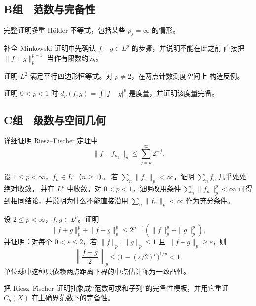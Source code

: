 \subsection*{B组　范数与完备性}
\begin{enumerate}[label=\textbf{\thechapter.\arabic*.},resume]
完整证明多重 Hölder 不等式，包括某些 \(p_j=\infty\) 的情形。

补全 Minkowski 证明中先确认 \(f+g\in L^p\) 的步骤，并说明不能在此之前
直接把 \(\|f+g\|_p^{p-1}\) 当作有限数约去。

证明 \(L^2\) 满足平行四边形恒等式。对 \(p\ne2\)，在两点计数测度空间上
构造反例。

证明 \(0<p<1\) 时 \(d_p(f,g)=\int|f-g|^p\) 是度量，并证明该度量完备。

\end{enumerate}
\subsection*{C组　级数与空间几何}
\begin{enumerate}[label=\textbf{\thechapter.\arabic*.},resume]
详细证明 Riesz--Fischer 定理中
\[
 \|f-f_{n_k}\|_p\le\sum_{j=k}^\infty2^{-j}.
\]

设 \(1\le p<\infty\)，\(f_n\in L^p\)（\(n\ge1\)）。
若 \(\sum_n\|f_n\|_p<\infty\)，证明 \(\sum_nf_n\) 几乎处处绝对收敛，
并在 \(L^p\) 中收敛。对 \(0<p<1\)，证明改用条件
\(\sum_n\|f_n\|_p^p<\infty\) 可得到相同结论，并说明为什么不能直接沿用
\(\sum_n\|f_n\|_p<\infty\) 作为充分条件。

设 \(2\le p<\infty\)，\(f,g\in L^p\)。证明
\[
 \|f+g\|_p^p+\|f-g\|_p^p
 \le 2^{p-1}(\|f\|_p^p+\|g\|_p^p),
\]
并证明：对每个 \(0<\varepsilon\le2\)，若
\(\|f\|_p,\|g\|_p\le1\) 且 \(\|f-g\|_p\ge\varepsilon\)，则
\[
 \left\|\frac{f+g}{2}\right\|_p
 \le\bigl(1-(\varepsilon/2)^p\bigr)^{1/p}<1.
\]
单位球中这种只依赖两点距离下界的中点估计称为一致凸性。

把 Riesz--Fischer 证明抽象成“范数可求和子列”的完备性模板，并用它重证
\(C_b(X)\) 在上确界范数下的完备性。
\end{enumerate}

